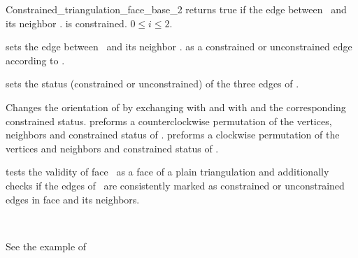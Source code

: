 \begin{ccRefConcept}{Constrained_triangulation_face_base_2}
{returns true if the edge between \ccVar\ and its neighbor 
\ccVar . is constrained.
\ccPrecond $0\leq i \leq 2$.}


\ccModifiers
{}
{sets the edge between \ccVar\ and its neighbor \ccVar .
 as a constrained or unconstrained edge according to .}

{sets the status (constrained or unconstrained) of the three
edges of \ccVar.}

{Changes the orientation of \ccVar by exchanging 
with  and  with 
and the corresponding constrained status.}
{preforms a counterclockwise permutation of the
 vertices, neighbors and constrained status of  \ccVar.}
{preforms a clockwise permutation of the
 vertices and neighbors and constrained status of \ccVar.}


\begin{ccAdvanced}
{tests the validity of face  \ccVar\ 
as a face of a plain triangulation
and additionally checks
if the edges of \ccVar\ are consistently marked
as constrained or unconstrained edges
in face \ccVar and its neighbors.}
\end{ccAdvanced}



\ccHasModels



\ccSeeAlso
{} \\


\ccExample
See the example of 

\end{ccRefConcept}


